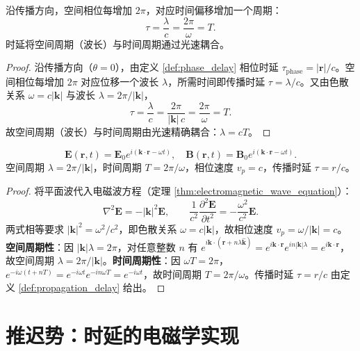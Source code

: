 \begin{proposition}[时延与相位的统一]\label{prop:delay_phase_unity}
沿传播方向，空间相位每增加 $2\pi$，对应时间偏移增加一个周期：
\[
\tau = \frac{\lambda}{c} = \frac{2\pi}{\omega} = T.
\]
时延将空间周期（波长）与时间周期通过光速耦合。
\end{proposition}

\begin{proof}
沿传播方向（$\theta=0$），由定义 \ref{def:phase_delay} 相位时延 $\tau_{\text{phase}} = |\mathbf{r}|/c$。空间相位每增加 $2\pi$ 对应位移一个波长 $\lambda$，所需时间即传播时延 $\tau = \lambda/c$。又由色散关系 $\omega = c|\mathbf{k}|$ 与波长 $\lambda = 2\pi/|\mathbf{k}|$，
\[
\tau = \frac{\lambda}{c} = \frac{2\pi}{|\mathbf{k}|\,c} = \frac{2\pi}{\omega} = T.
\]
故空间周期（波长）与时间周期由光速精确耦合：$\lambda = cT$。
\end{proof}

\begin{proposition}[平面电磁波的周期结构]\label{prop:plane_wave_periodic}
\[
\mathbf{E}(\mathbf{r}, t) = \mathbf{E}_0 e^{i(\mathbf{k} \cdot \mathbf{r} - \omega t)}, \quad \mathbf{B}(\mathbf{r}, t) = \mathbf{B}_0 e^{i(\mathbf{k} \cdot \mathbf{r} - \omega t)}.
\]
空间周期 $\lambda = 2\pi/|\mathbf{k}|$，时间周期 $T = 2\pi/\omega$，相位速度 $v_p = c$，传播时延 $\tau = r/c$。
\end{proposition}

\begin{proof}
将平面波代入电磁波方程（定理 \ref{thm:electromagnetic_wave_equation}）：
\[
\nabla^2\mathbf{E} = -|\mathbf{k}|^2\mathbf{E}, \qquad \frac{1}{c^2}\frac{\partial^2\mathbf{E}}{\partial t^2} = -\frac{\omega^2}{c^2}\mathbf{E}.
\]
两式相等要求 $|\mathbf{k}|^2 = \omega^2/c^2$，即色散关系 $\omega = c|\mathbf{k}|$，故相位速度 $v_p = \omega/|\mathbf{k}| = c$。\textbf{空间周期性}：因 $|\mathbf{k}|\lambda = 2\pi$，对任意整数 $n$ 有 $e^{i\mathbf{k}\cdot(\mathbf{r}+n\lambda\hat{\mathbf{k}})} = e^{i\mathbf{k}\cdot\mathbf{r}}e^{i n|\mathbf{k}|\lambda} = e^{i\mathbf{k}\cdot\mathbf{r}}$，故空间周期 $\lambda = 2\pi/|\mathbf{k}|$。\textbf{时间周期性}：因 $\omega T = 2\pi$，$e^{-i\omega(t+nT)} = e^{-i\omega t}e^{-i n\omega T} = e^{-i\omega t}$，故时间周期 $T = 2\pi/\omega$。传播时延 $\tau = r/c$ 由定义 \ref{def:propagation_delay} 给出。
\end{proof}

\section{推迟势：时延的电磁学实现}

